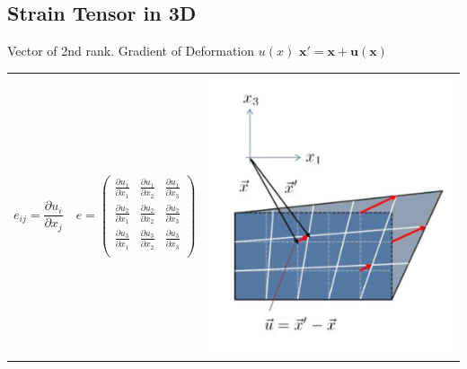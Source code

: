 \subsection{Strain Tensor in 3D}
	Vector of 2nd rank. Gradient of Deformation $u(x)$ \hspace{1cm}$\bm x' = \bm x + \bm u(\bm x)$
	
	\begin{tabularx}{\columnwidth}{p{2cm}XX}
		\hline 
		   $e_{ij} = \dfrac{\partial u_i}{\partial x_j}$&
			$e = \begin{pmatrix}
			\frac{\partial u_1}{\partial x_1} & \frac{\partial u_1}{\partial x_2} &
			\frac{\partial u_1}{\partial x_3}\\
			\frac{\partial u_2}{\partial x_1} & \frac{\partial u_2}{\partial x_2} &
			\frac{\partial u_2}{\partial x_3}\\
			\frac{\partial u_3}{\partial x_1} & \frac{\partial u_3}{\partial x_2} &
			\frac{\partial u_3}{\partial x_3}\\
			\end{pmatrix}$ &
			\vspace*{-.5cm}\includegraphics[scale=.2]{images/2Ddeformation}\\
			

\end{tabularx}
